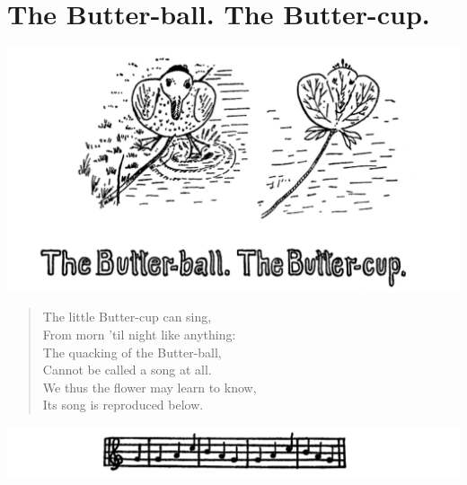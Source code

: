 \documentclass[letterpaper, 10pt, openany]{memoir}
\begin{document}
\chapter{The Butter-ball. The Butter-cup.}
\includegraphics[width=1\textwidth]{f-p22a.png}
\vspace{\onelineskip}
\begin{verse}\huge
The little Butter-cup can sing,\\
From morn 'til night like anything:\\
The quacking of the Butter-ball,\\
Cannot be called a song at all.\\
We thus the flower may learn to know,\\
Its song is reproduced below.\\
\end{verse}
\vspace{\onelineskip}
\includegraphics[width=1\textwidth]{f-p22b.png}
\end{document}
